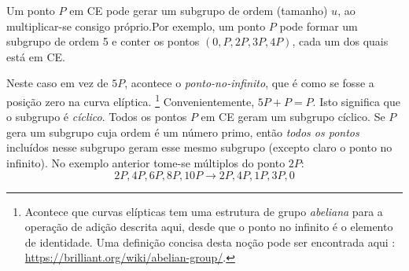 Um ponto $P$ em CE pode gerar um subgrupo de ordem (tamanho) $u$, ao multiplicar-se consigo próprio.\newline Por exemplo, um ponto $P$ pode formar um subgrupo de ordem 5 e conter os pontos $(0, P, 2P, 3P, 4P)$, cada um dos quais está em CE.  

Neste caso em vez de $5P$, acontece o {\em ponto-no-infinito}, que é como se fosse a posição zero na curva elíptica.
\footnote{Acontece que curvas elípticas tem uma estrutura de grupo {\em abeliana} para a operação de adição descrita aqui, desde que o ponto no infinito é o elemento de identidade. Uma definição concisa desta noção pode ser encontrada aqui : \url{https://brilliant.org/wiki/abelian-group/}.}
Convenientemente, $5P + P = P$. Isto significa que o subgrupo é {\em cíclico}.
\newline Todos os pontos $P$ em CE geram um subgrupo cíclico. Se $P$ gera um subgrupo cuja ordem é um número primo, então {\em todos os pontos} incluídos nesse subgrupo geram esse mesmo subgrupo (excepto claro o ponto no infinito).
No exemplo anterior tome-se múltiplos do ponto $2P$:\vspace{.175cm}  
\[2P, 4P, 6P, 8P, 10P \rightarrow 2P, 4P, 1P, 3P, 0\]


